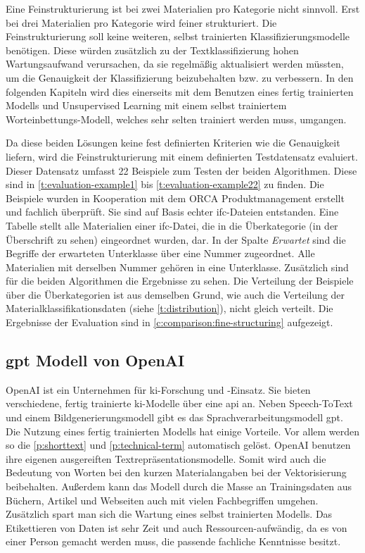 Eine Feinstrukturierung ist bei zwei Materialien pro Kategorie nicht sinnvoll. Erst bei drei Materialien pro Kategorie wird feiner strukturiert. Die Feinstrukturierung soll keine weiteren, selbst trainierten Klassifizierungsmodelle benötigen. Diese würden zusätzlich zu der Textklassifizierung hohen Wartungsaufwand verursachen, da sie regelmäßig aktualisiert werden müssten, um die Genauigkeit der Klassifizierung beizubehalten bzw. zu verbessern. In den folgenden Kapiteln wird dies einerseits mit dem Benutzen eines fertig trainierten Modells und Unsupervised Learning mit einem selbst trainiertem Worteinbettungs-Modell, welches sehr selten trainiert werden muss, umgangen.

Da diese beiden Lösungen keine fest definierten Kriterien wie die Genauigkeit liefern, wird die Feinstrukturierung mit einem definierten Testdatensatz evaluiert. Dieser Datensatz umfasst 22 Beispiele zum Testen der beiden Algorithmen. Diese sind in \autoref{t:evaluation-example1} bis \autoref{t:evaluation-example22} zu finden. Die Beispiele wurden in Kooperation mit dem ORCA Produktmanagement erstellt und fachlich überprüft. Sie sind auf Basis echter \ac{ifc}-Dateien entstanden. Eine Tabelle stellt alle Materialien einer \ac{ifc}-Datei, die in die Überkategorie (in der Überschrift zu sehen) eingeordnet wurden, dar. In der Spalte \textit{Erwartet} sind die Begriffe der erwarteten Unterklasse über eine Nummer zugeordnet. Alle Materialien mit derselben Nummer gehören in eine Unterklasse. Zusätzlich sind für die beiden Algorithmen die Ergebnisse zu sehen. Die Verteilung der Beispiele über die Überkategorien ist aus demselben Grund, wie auch die Verteilung der Materialklassifikationsdaten (siehe \autoref{t:distribution}), nicht gleich verteilt. Die Ergebnisse der Evaluation sind in \autoref{c:comparison:fine-structuring} aufgezeigt.



\subsection{\acf{gpt} Modell von OpenAI}
\label{c:conception:fine-structuring:openai}
OpenAI ist ein Unternehmen für \ac{ki}-Forschung und -Einsatz. Sie bieten verschiedene, fertig trainierte \ac{ki}-Modelle über eine \ac{api} an. Neben Speech-ToText und einem Bildgenerierungsmodell gibt es das Sprachverarbeitungsmodell \ac{gpt}. \citep[vgl.][]{openai_company}
Die Nutzung eines fertig trainierten Modells hat einige Vorteile. Vor allem werden so die \autoref{p:shorttext} und \autoref{p:technical-term} automatisch gelöst. OpenAI benutzen ihre eigenen ausgereiften Textrepräsentationsmodelle. Somit wird auch die Bedeutung von Worten bei den kurzen Materialangaben bei der Vektorisierung beibehalten. Außerdem kann das Modell durch die Masse an Trainingsdaten aus Büchern, Artikel und Webseiten auch mit vielen Fachbegriffen umgehen. Zusätzlich spart man sich die Wartung eines selbst trainierten Modells. Das Etikettieren von Daten ist sehr Zeit und auch Ressourcen-aufwändig, da es von einer Person gemacht werden muss, die passende fachliche Kenntnisse besitzt.

